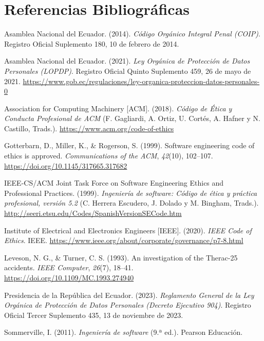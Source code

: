 \documentclass[12pt,a4paper,oneside]{article}
\begin{document}
\section*{Referencias Bibliográficas}

\begingroup
\setlength{\parindent}{-1.27cm}
\setlength{\leftskip}{1.27cm}
\setlength{\parskip}{8pt}

Asamblea Nacional del Ecuador. (2014). \textit{Código Orgánico Integral Penal (COIP)}. Registro Oficial Suplemento 180, 10 de febrero de 2014.

Asamblea Nacional del Ecuador. (2021). \textit{Ley Orgánica de Protección de Datos Personales (LOPDP)}. Registro Oficial Quinto Suplemento 459, 26 de mayo de 2021. \url{https://www.gob.ec/regulaciones/ley-organica-proteccion-datos-personales-0}

Association for Computing Machinery [ACM]. (2018). \textit{Código de Ética y Conducta Profesional de ACM} (F. Gagliardi, A. Ortiz, U. Cortés, A. Hafner y N. Castillo, Trads.). \url{https://www.acm.org/code-of-ethics}

Gotterbarn, D., Miller, K., \& Rogerson, S. (1999). Software engineering code of ethics is approved. \textit{Communications of the ACM}, \textit{42}(10), 102--107. \url{https://doi.org/10.1145/317665.317682}

IEEE-CS/ACM Joint Task Force on Software Engineering Ethics and Professional Practices. (1999). \textit{Ingeniería de software: Código de ética y práctica profesional, versión 5.2} (C. Herrera Escudero, J. Dolado y M. Bingham, Trads.). \url{http://seeri.etsu.edu/Codes/SpanishVersionSECode.htm}

Institute of Electrical and Electronics Engineers [IEEE]. (2020). \textit{IEEE Code of Ethics}. IEEE. \url{https://www.ieee.org/about/corporate/governance/p7-8.html}

Leveson, N. G., \& Turner, C. S. (1993). An investigation of the Therac-25 accidents. \textit{IEEE Computer}, \textit{26}(7), 18--41. \url{https://doi.org/10.1109/MC.1993.274940}

Presidencia de la República del Ecuador. (2023). \textit{Reglamento General de la Ley Orgánica de Protección de Datos Personales (Decreto Ejecutivo 904)}. Registro Oficial Tercer Suplemento 435, 13 de noviembre de 2023.

Sommerville, I. (2011). \textit{Ingeniería de software} (9.ª ed.). Pearson Educación.

\endgroup
\end{document}
